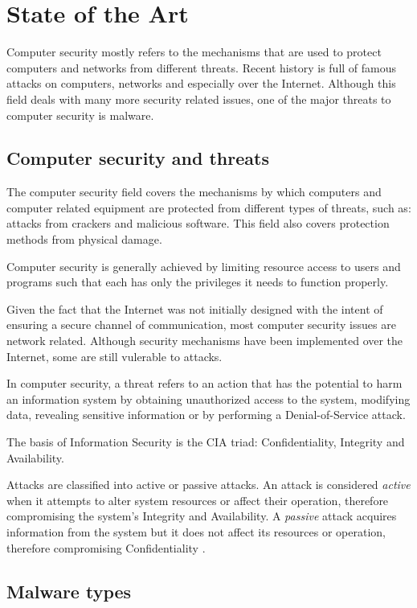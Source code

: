 \chapter{State of the Art}
\label{chapter:second}

Computer security mostly refers to the mechanisms that are used to protect computers and networks from different threats. Recent history is full of famous attacks on computers, networks and especially over the Internet. Although this field deals with many more security related issues, one of the major threats to computer security is malware.

\section{Computer security and threats}

The computer security field covers the mechanisms by which computers and computer related equipment are protected from different types of threats, such as: attacks from crackers and malicious software. This field also covers protection methods from physical damage.

Computer security is generally achieved by limiting resource access to users and programs such that each has only the privileges it needs to function properly.

Given the fact that the Internet was not initially designed with the intent of ensuring a secure channel of communication, most computer security issues are network related. Although security mechanisms have been implemented over the Internet, some are still vulerable to attacks.

In computer security, a threat refers to an action that has the potential to harm an information system by obtaining unauthorized access to the system, modifying data, revealing sensitive information or by performing a Denial-of-Service attack.

The basis of Information Security is the CIA triad: Confidentiality, Integrity and Availability.

Attacks are classified into active or passive attacks. An attack is considered \textit{active} when it attempts to alter system resources or affect their operation, therefore compromising the system's Integrity and Availability.
A \textit{passive} attack acquires information from the system but it does not affect its resources or operation, therefore compromising Confidentiality \cite{rfc2828}.

\section{Malware types}
\label{sec:mal-types}

